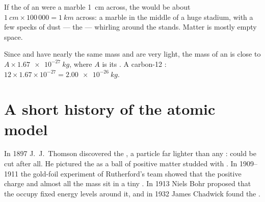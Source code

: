 \begin{example}\label{ex:g9:inside-the-atom:marble}
If the  of an  were a marble \qty{1}{cm} across, the 
would be about $\qty{1}{cm} \times 100\,000 = \qty{1}{km}$ across: a
marble in the middle of a huge stadium, with a few specks of dust ---
the  --- whirling around the stands. Matter is mostly empty
space.
\end{example}

\begin{method}\label{met:g9:inside-the-atom:mass}
Since  and  have nearly the same mass and  are
very light, the mass of an  is close to $A \times
\qty{1.67e-27}{kg}$, where $A$ is its . A carbon-12 :
$12 \times 1.67 \times 10^{-27} = \qty{2.00e-26}{kg}$.
\end{method}

\section{A short history of the atomic model}

\begin{history}
In 1897 J.~J.~Thomson discovered the , a particle far lighter
than any :  could be cut after all. He pictured the  as a
ball of positive matter studded with . In 1909--1911 the
gold-foil experiment of Rutherford's team showed that the positive
charge and almost all the mass sit in a tiny . In 1913 Niels
Bohr proposed that the  occupy fixed energy levels around it,
and in 1932 James Chadwick found the .
\end{history}

